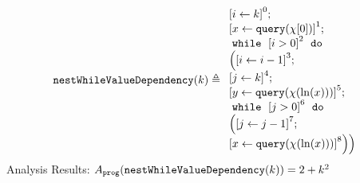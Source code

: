                     \begin{example}
                        \label{ex:nestWhileValueDependency}
                        \[
                        \kw{nestWhileValueDependency}(k) \triangleq 
                        \begin{array}{l}
                            \clabel{ \assign{i}{k} }^{0} ; \\
                            \clabel{\assign{x}{\query(\chi[0])}}^{1} ; \\
                                \ewhile ~ \clabel{i > 0}^{2} ~ \edo ~ \\
                                \Big(
                                 \clabel{\assign{i}{i-1}}^{3} ;\\
                                 \clabel{\assign{j}{k}}^{4} ;\\
                                 \clabel{\assign{y}{\query(\chi(\ln(x)))} }^{5}  ; \\
                                 \ewhile ~ \clabel{j > 0}^{6} ~ \edo ~ \\
                                 \Big(
                                  \clabel{\assign{j}{j-1}}^{7};\\
                                  \clabel{\assign{x}{\query(\chi(\ln(x)))} }^{8}
                                  \Big) \Big)
                            \end{array}
                        \]
                        Analysis Results: $ A_{\mathtt{prog}}(\mathtt{nestWhileValueDependency}(k)) = 2 + k^2 $
                    \end{example}
    
